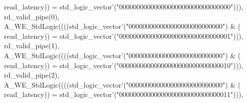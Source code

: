 \begin{DoxyCode}
{      read_latency}\textcolor{vhdlchar}{)}\textcolor{vhdlchar}{)} \textcolor{vhdlchar}{=} \textcolor{comment}{std\_logic\_vector}\textcolor{vhdlchar}{'}\textcolor{vhdlchar}{(}\textcolor{vhdllogic}{"00000000000000000000000000000000"}\textcolor{vhdlchar}{)}\textcolor{vhdlchar}{)}\textcolor{vhdlchar}{)}\textcolor{vhdlchar}{,} \textcolor{vhdlchar}{
      rd_valid_pipe}\textcolor{vhdlchar}{(}\textcolor{vhdllogic}{}\textcolor{vhdllogic}{0}\textcolor{vhdlchar}{)}\textcolor{vhdlchar}{,} \textcolor{vhdlchar}{A\_WE\_StdLogic}\textcolor{vhdlchar}{(}\textcolor{vhdlchar}{(}\textcolor{vhdlchar}{(}\textcolor{vhdlchar}{(}\textcolor{comment}{std\_logic\_vector}\textcolor{vhdlchar}{'}\textcolor{vhdlchar}{(}\textcolor{vhdllogic}{"000000000000000000000000000"}\textcolor{vhdlchar}{)} \textcolor{vhdlchar}{&} \textcolor{vhdlchar}{(}\textcolor{vhdlchar}{
      read_latency}\textcolor{vhdlchar}{)}\textcolor{vhdlchar}{)} \textcolor{vhdlchar}{=} \textcolor{comment}{std\_logic\_vector}\textcolor{vhdlchar}{'}\textcolor{vhdlchar}{(}\textcolor{vhdllogic}{"00000000000000000000000000000001"}\textcolor{vhdlchar}{)}\textcolor{vhdlchar}{)}\textcolor{vhdlchar}{)}\textcolor{vhdlchar}{,} \textcolor{vhdlchar}{
      rd_valid_pipe}\textcolor{vhdlchar}{(}\textcolor{vhdllogic}{}\textcolor{vhdllogic}{1}\textcolor{vhdlchar}{)}\textcolor{vhdlchar}{,} \textcolor{vhdlchar}{A\_WE\_StdLogic}\textcolor{vhdlchar}{(}\textcolor{vhdlchar}{(}\textcolor{vhdlchar}{(}\textcolor{vhdlchar}{(}\textcolor{comment}{std\_logic\_vector}\textcolor{vhdlchar}{'}\textcolor{vhdlchar}{(}\textcolor{vhdllogic}{"000000000000000000000000000"}\textcolor{vhdlchar}{)} \textcolor{vhdlchar}{&} \textcolor{vhdlchar}{(}\textcolor{vhdlchar}{
      read_latency}\textcolor{vhdlchar}{)}\textcolor{vhdlchar}{)} \textcolor{vhdlchar}{=} \textcolor{comment}{std\_logic\_vector}\textcolor{vhdlchar}{'}\textcolor{vhdlchar}{(}\textcolor{vhdllogic}{"00000000000000000000000000000010"}\textcolor{vhdlchar}{)}\textcolor{vhdlchar}{)}\textcolor{vhdlchar}{)}\textcolor{vhdlchar}{,} \textcolor{vhdlchar}{
      rd_valid_pipe}\textcolor{vhdlchar}{(}\textcolor{vhdllogic}{}\textcolor{vhdllogic}{2}\textcolor{vhdlchar}{)}\textcolor{vhdlchar}{,} \textcolor{vhdlchar}{A\_WE\_StdLogic}\textcolor{vhdlchar}{(}\textcolor{vhdlchar}{(}\textcolor{vhdlchar}{(}\textcolor{vhdlchar}{(}\textcolor{comment}{std\_logic\_vector}\textcolor{vhdlchar}{'}\textcolor{vhdlchar}{(}\textcolor{vhdllogic}{"000000000000000000000000000"}\textcolor{vhdlchar}{)} \textcolor{vhdlchar}{&} \textcolor{vhdlchar}{(}\textcolor{vhdlchar}{
      read_latency}\textcolor{vhdlchar}{)}\textcolor{vhdlchar}{)} \textcolor{vhdlchar}{=} \textcolor{comment}{std\_logic\_vector}\textcolor{vhdlchar}{'}\textcolor{vhdlchar}{(}\textcolor{vhdllogic}{"00000000000000000000000000000011"}\textcolor{vhdlchar}{)}\textcolor{vhdlchar}{)}\textcolor{vhdlchar}{)}\textcolor{vhdlchar}{,} \textcolor{vhdlchar}{
}
\end{DoxyCode}
